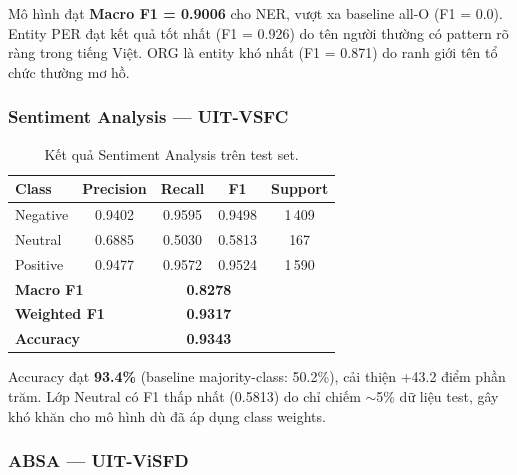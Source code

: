 Mô hình đạt \textbf{Macro F1 = 0.9006} cho NER, vượt xa baseline all-O (F1 = 0.0).
Entity PER đạt kết quả tốt nhất (F1 = 0.926) do tên người thường có pattern rõ ràng trong tiếng Việt.
ORG là entity khó nhất (F1 = 0.871) do ranh giới tên tổ chức thường mơ hồ.

\subsubsection{Sentiment Analysis — UIT-VSFC}

\begin{table}[H]
\centering
\caption{Kết quả Sentiment Analysis trên test set.}
\label{tab:sent_results}
\begin{tabular}{lcccc}
\toprule
\textbf{Class} & \textbf{Precision} & \textbf{Recall} & \textbf{F1} & \textbf{Support} \\
\midrule
Negative & 0.9402 & 0.9595 & 0.9498 & 1\,409 \\
Neutral  & 0.6885 & 0.5030 & 0.5813 & 167 \\
Positive & 0.9477 & 0.9572 & 0.9524 & 1\,590 \\
\midrule
\multicolumn{2}{l}{\textbf{Macro F1}} & \multicolumn{2}{c}{\textbf{0.8278}} & \\
\multicolumn{2}{l}{\textbf{Weighted F1}} & \multicolumn{2}{c}{\textbf{0.9317}} & \\
\multicolumn{2}{l}{\textbf{Accuracy}} & \multicolumn{2}{c}{\textbf{0.9343}} & \\
\bottomrule
\end{tabular}
\end{table}

Accuracy đạt \textbf{93.4\%} (baseline majority-class: 50.2\%), cải thiện +43.2 điểm phần trăm.
Lớp Neutral có F1 thấp nhất (0.5813) do chỉ chiếm $\sim$5\% dữ liệu test,
gây khó khăn cho mô hình dù đã áp dụng class weights.

\subsubsection{ABSA — UIT-ViSFD}


